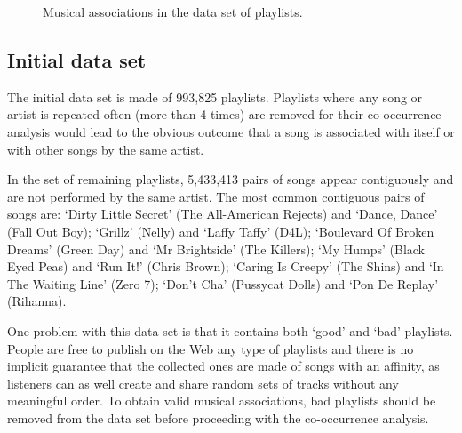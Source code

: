 \begin{figure}[bthp]
\centering \setlength{\abovecaptionskip}{3pt}
\caption{Musical associations in the data set of playlists.}
\label{fig:mystrands_bubbles}
\end{figure}
%

\subsection{Initial data set} %
\label{sub:noise_removal}

The initial data set is made of 993,825 playlists. %
Playlists where any song or artist is repeated often (more than 4 times) are removed for their co-occurrence analysis would lead to the obvious outcome that a song is associated with itself or with other songs by the same artist.

In the set of remaining playlists, 5,433,413 pairs of songs appear contiguously and are not performed by the same artist. 
The most common contiguous pairs of songs are: `Dirty Little Secret' (The All-American Rejects) and `Dance, Dance' (Fall Out Boy); `Grillz' (Nelly) and  `Laffy Taffy' (D4L); `Boulevard Of Broken Dreams' (Green Day) and `Mr Brightside' (The Killers); `My Humps' (Black Eyed Peas) and `Run It!' (Chris Brown); `Caring Is Creepy' (The Shins) and `In The Waiting Line' (Zero 7); `Don't Cha' (Pussycat Dolls) and `Pon De Replay' (Rihanna).

One problem with this data set is that it contains both `good' and `bad' playlists.
People are free to publish on the Web any type of playlists and there is no implicit guarantee that the collected ones are made of songs with an affinity, as listeners can as well create and share random sets of tracks without any meaningful order.
To obtain valid musical associations, bad playlists should be removed from the data set before proceeding with the co-occurrence analysis.


